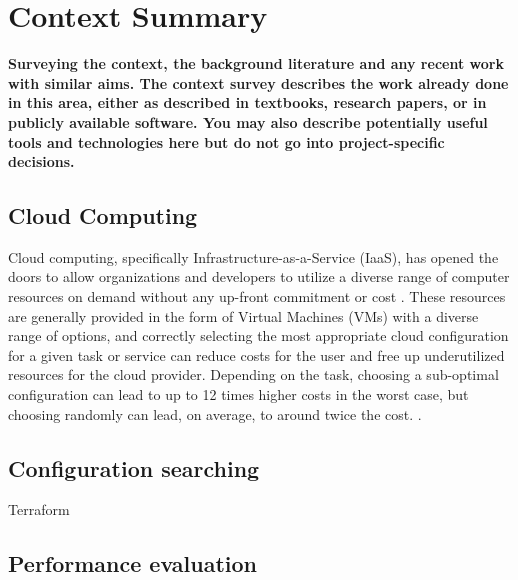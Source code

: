 \documentclass{article}
\begin{document}
\section{Context Summary}
\textbf{Surveying the context, the background literature and any
recent work with similar aims. The context survey
describes the work already done in this area, either as
described in textbooks, research papers, or in publicly
available software. You may also describe potentially
useful tools and technologies here but do not go into
project-specific decisions.} \\

\subsection{Cloud Computing}
Cloud computing, specifically Infrastructure-as-a-Service (IaaS), has opened the doors to allow organizations and developers to utilize a diverse range of computer resources on demand without any up-front commitment or cost \cite{Armbrust2009}. These resources are generally provided in the form of Virtual Machines (VMs) with a diverse range of options, and correctly selecting the most appropriate cloud configuration for a given task or service can reduce costs for the user and free up underutilized resources for the cloud provider. Depending on the task, choosing a sub-optimal configuration can lead to up to 12 times higher costs in the worst case, but choosing randomly can lead, on average, to around twice the cost. \cite{Alipourfard2017}.
\bigskip

\subsection{Configuration searching}
Terraform

\subsection{Performance evaluation}
\end{document}
